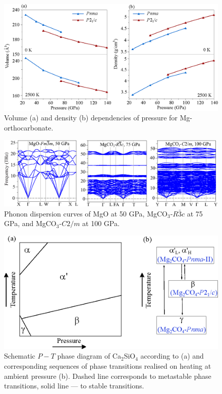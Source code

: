 \documentclass[a4paperm]{article}
\begin{document}
\begin{figure}[H]
	\includegraphics[width=\textwidth]{pv} \centering
	\caption{Volume (a) and density (b) dependencies of pressure for Mg-orthocarbonate.} \label{V-P}
\end{figure}

\begin{figure}[H]
	\includegraphics[width=\textwidth]{phon_MgCO3} \centering
	\caption{Phonon dispersion curves of MgO at 50 GPa, MgCO$_3$-$R\bar{3}c$ at 75 GPa, and MgCO$_3$-$C2/m$ at 100 GPa.} \label{phon_mgco3}
\end{figure}

\begin{figure}[H]
	\includegraphics[width=\textwidth]{pt_scheme} \centering
	\caption{Schematic $P-T$ phase diagram of Ca$_2$SiO$_4$  according to \cite{belmonte2017} (a) and corresponding sequences of phase transitions realised on heating at ambient pressure (b). Dashed line corresponds to metastable phase transitions, solid line --- to stable transitions.} \label{ca2sio4_pt}
\end{figure}
\end{document}

